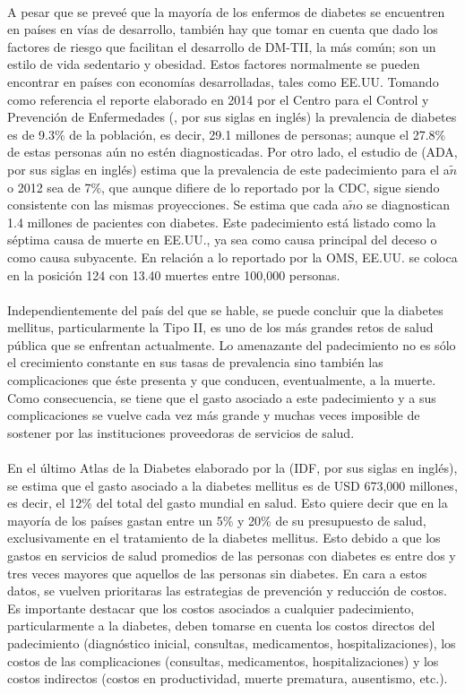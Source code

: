 \\
A pesar que se preve\'e que la mayor\'ia de los enfermos de diabetes se encuentren en pa\'ises en v\'ias de desarrollo, tambi\'en hay que tomar en cuenta que dado los factores de riesgo que facilitan el desarrollo de DM-TII, la m\'as com\'un; son un estilo de vida sedentario y obesidad. Estos factores normalmente se pueden encontrar en pa\'ises con econom\'ias desarrolladas, tales como EE.UU. Tomando como referencia el reporte elaborado en 2014 por el Centro para el Control y Prevenci\'on de Enfermedades (\cite{CDCStatistics}, por sus siglas en ingl\'es) la prevalencia de diabetes es de 9.3\% de la poblaci\'on, es decir, 29.1 millones de personas; aunque el 27.8\% de estas personas a\'un no est\'en diagnosticadas. Por otro lado, el estudio de \cite{american2013economic} (ADA, por sus siglas en ingl\'es) estima que la prevalencia de este padecimiento para el a$\tilde{n}$o 2012 sea de 7\%, que aunque difiere de lo reportado por la CDC, sigue siendo consistente con las mismas proyecciones. Se estima que cada a$\tilde{n}$o se diagnostican 1.4 millones de pacientes con diabetes. Este padecimiento est\'a listado como la s\'eptima causa de muerte en EE.UU., ya sea como causa principal del deceso o como causa subyacente. En relaci\'on a lo reportado por la OMS, EE.UU. se coloca en la posici\'on 124 con 13.40 muertes entre 100,000 personas. \\
\\
Independientemente del pa\'is del que se hable, se puede concluir que la diabetes mellitus, particularmente la Tipo II, es uno de los m\'as grandes retos de salud p\'ublica que se enfrentan actualmente. Lo amenazante del padecimiento no es s\'olo el crecimiento constante en sus tasas de prevalencia sino tambi\'en las complicaciones que \'este presenta y que conducen, eventualmente, a la muerte. Como consecuencia, se tiene que el gasto asociado a este padecimiento y a sus complicaciones se vuelve cada vez m\'as grande y muchas veces imposible de sostener por las instituciones proveedoras de servicios de salud.\\
\\
En el \'ultimo Atlas de la Diabetes elaborado por la \cite{atlas2015international} (IDF, por sus siglas en ingl\'es), se estima que el gasto asociado a la diabetes mellitus es de USD 673,000 millones, es decir, el 12\% del total del gasto mundial en salud. Esto quiere decir que en la mayor\'ia de los pa\'ises gastan entre un 5\% y 20\% de su presupuesto de salud, exclusivamente en el tratamiento de la diabetes mellitus. Esto debido a que los gastos en servicios de salud promedios de las personas con diabetes es entre dos y tres veces mayores que aquellos de las personas sin diabetes. En cara a estos datos, se vuelven prioritaras las estrategias de prevenci\'on y reducci\'on de costos. Es importante destacar que los costos asociados a cualquier padecimiento, particularmente a la diabetes, deben tomarse en cuenta los costos directos del padecimiento (diagn\'ostico inicial, consultas, medicamentos, hospitalizaciones), los costos de las complicaciones (consultas, medicamentos, hospitalizaciones) y los costos indirectos (costos en productividad, muerte prematura, ausentismo, etc.).\\
